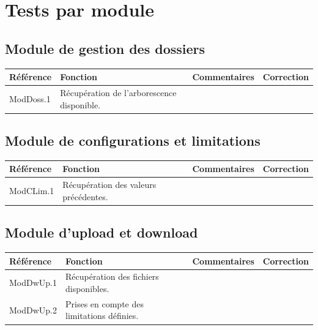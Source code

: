 \documentclass[10pt,a4paper,landscape]{report}
\begin{document}

\section{Tests par module}

\subsection{Module de gestion des dossiers}

\begin{center}
	\bgroup
	\def\arraystretch{1.5}
	\begin{tabular}{|p{2.5cm}|p{8cm}|p{8cm}|p{8cm}|}
		\hline
		\rowcolor{gris}Référence & Fonction & Commentaires & Correction\\
		\hline
		ModDoss.1 & Récupération de l'arborescence disponible. & & \\
		\hline
	\end{tabular}
	\egroup
\end{center}


\subsection{Module de configurations et limitations}

\begin{center}
	\bgroup
	\def\arraystretch{1.5}
	\begin{tabular}{|p{2.5cm}|p{8cm}|p{8cm}|p{8cm}|}
		\hline
		\rowcolor{gris}Référence & Fonction & Commentaires & Correction\\
		\hline
		ModCLim.1 & Récupération des valeurs précédentes. & & \\
		\hline
	\end{tabular}
	\egroup
\end{center}


\subsection{Module d'upload et download}

\begin{center}
	\bgroup
	\def\arraystretch{1.5}
	\begin{tabular}{|p{2.5cm}|p{8cm}|p{8cm}|p{8cm}|}
		\hline
		\rowcolor{gris}Référence & Fonction & Commentaires & Correction\\
		\hline
		ModDwUp.1 & Récupération des fichiers disponibles. & & \\
		\hline
		ModDwUp.2 & Prises en compte des limitations définies. & & \\
		\hline
	\end{tabular}
	\egroup
\end{center}
\end{document}
